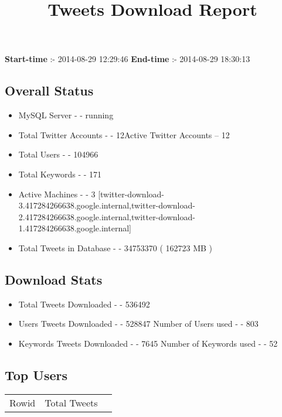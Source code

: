 \documentclass{article}\usepackage[T1]{fontenc}
\begin{document}
\title{\textbf{Tweets Download Report}}
               \date{}
                \maketitle
               \centerline{\textbf{Start-time} :- 2014-08-29 12:29:46 \hspace{40pt} \textbf{End-time} :- 2014-08-29 18:30:13}               \subsection*{Overall Status}                \begin{itemize}                \item MySQL Server - - running               \item Total Twitter Accounts - - 12\newline Active Twitter Accounts -- 12               \item Total Users - - 104966               \item Total Keywords - - 171               \item Active Machines - - 3 [twitter-download-3.417284266638.google.internal,twitter-download-2.417284266638.google.internal,twitter-download-1.417284266638.google.internal]               \item Total Tweets in Database - - 34753370 ( 162723 MB )               \end{itemize}               \subsection*{Download Stats}                \begin{itemize}                \item Total Tweets Downloaded - - 536492               \item Users Tweets Downloaded - - 528847 \newline Number of Users used - - 803               \item Keywords Tweets Downloaded - - 7645 \newline Number of Keywords used - - 52              \end{itemize}              \subsection*{Top Users}\begin{tabular}{|c|c|c|}         \hline         Rowid & Total Tweets \\ 

\end{tabular}
\end{document}
